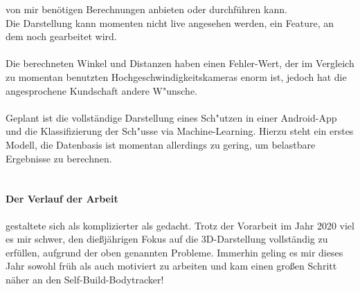 von mir benötigen Berechnungen anbieten oder durchführen kann.\\
Die Darstellung kann momenten nicht live angesehen werden, ein Feature, an dem noch
gearbeitet wird.\\
\\
Die berechneten Winkel und Distanzen haben einen Fehler-Wert, der im Vergleich
zu momentan benutzten Hochgeschwindigkeitskameras enorm ist, jedoch 
hat die angesprochene Kundschaft andere W"unsche.\\
\\
Geplant ist die vollständige Darstellung eines Sch"utzen in einer Android-App
und die Klassifizierung der Sch"usse via Machine-Learning. Hierzu steht ein erstes Modell,
die Datenbasis ist momentan allerdings zu gering, um belastbare Ergebnisse zu berechnen.\\
\\
\paragraph{Der Verlauf der Arbeit} gestaltete sich als komplizierter als 
gedacht. Trotz der Vorarbeit im Jahr 2020 viel es mir schwer, den dießjährigen Fokus auf die
3D-Darstellung vollständig zu erfüllen, aufgrund der oben genannten Probleme. 
Immerhin geling es mir dieses Jahr sowohl früh als auch motiviert zu arbeiten und kam einen
großen Schritt näher an den Self-Build-Bodytracker! 